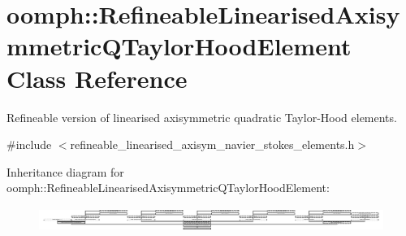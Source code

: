\hypertarget{classoomph_1_1RefineableLinearisedAxisymmetricQTaylorHoodElement}{}\section{oomph\+:\+:Refineable\+Linearised\+Axisymmetric\+Q\+Taylor\+Hood\+Element Class Reference}
\label{classoomph_1_1RefineableLinearisedAxisymmetricQTaylorHoodElement}


Refineable version of linearised axisymmetric quadratic Taylor-\/\+Hood elements.  




{\ttfamily \#include $<$refineable\+\_\+linearised\+\_\+axisym\+\_\+navier\+\_\+stokes\+\_\+elements.\+h$>$}

Inheritance diagram for oomph\+:\+:Refineable\+Linearised\+Axisymmetric\+Q\+Taylor\+Hood\+Element\+:\begin{figure}[H]
\begin{center}
\leavevmode
\includegraphics[height=0.812604cm]{classoomph_1_1RefineableLinearisedAxisymmetricQTaylorHoodElement}
\end{center}
\end{figure}
